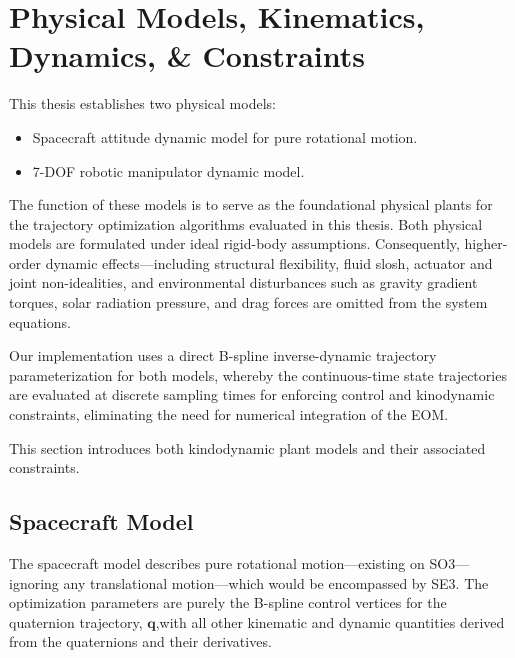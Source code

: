 \section{Physical Models, Kinematics, Dynamics, \& Constraints}
\label{sec:methodology-dynamics}

This thesis establishes two physical models:
\begin{itemize}
    \item Spacecraft attitude dynamic model for pure rotational motion.
    \item 7-DOF robotic manipulator dynamic model.
\end{itemize}
The function of these models is to serve as the foundational physical plants for the trajectory optimization algorithms evaluated in this thesis.
Both physical models are formulated under ideal rigid-body assumptions. 
Consequently, higher-order dynamic effects—including structural flexibility, fluid slosh, actuator and joint non-idealities, and environmental disturbances such as gravity gradient torques, solar radiation pressure, and drag forces are omitted from the system equations.

Our implementation uses a direct B-spline inverse-dynamic trajectory parameterization for both models, 
whereby the continuous-time state trajectories are evaluated at discrete sampling times for enforcing control and kinodynamic constraints, 
eliminating the need for numerical integration of the \ac{EOM}.

This section introduces both kindodynamic plant models and their associated constraints.

\subsection{Spacecraft Model}
\label{sec:methodology_dynamics_spacecraft_model}
The spacecraft model describes pure rotational motion---existing on \ac{SO3}---ignoring any translational motion---which would be encompassed by \ac{SE3}.
The optimization parameters are purely the B-spline control vertices for the quaternion trajectory, $\mathbf{q}$,with all other kinematic and dynamic quantities derived from the quaternions and their derivatives.

